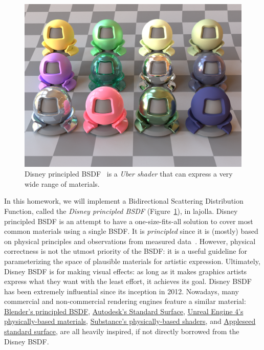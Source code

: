 




\begin{figure}[h]
    \includegraphics[width=\linewidth]{imgs/disney_bsdf.png}
    \caption{Disney principled BSDF~\cite{Burley:2012:PBS,Burley:2015:EDB} is a \emph{Uber shader} that can express a very wide range of materials.}
    \label{fig:gallery}
\end{figure}

In this homework, we will implement a Bidirectional Scattering Distribution Function, called the \emph{Disney principled BSDF} (Figure~\ref{fig:gallery}), in lajolla. Disney principled BSDF is an attempt to have a one-size-fits-all solution to cover most common materials using a single BSDF. It is \emph{principled} since it is (mostly) based on physical principles and observations from measured data~\cite{Matusik:2003:DRM}. However, physical correctness is not the utmost priority of the BSDF: it is a useful guideline for parameterizing the space of plausible materials for artistic expression. Ultimately, Disney BSDF is for making visual effects: as long as it makes graphics artists express what they want with the least effort, it achieves its goal. Disney BSDF has been extremely influential since its inception in 2012. Nowadays, many commercial and non-commercial rendering engines feature a similar material: \href{https://docs.blender.org/manual/en/latest/render/shader_nodes/shader/principled.html}{Blender's principled BSDF}, \href{https://autodesk.github.io/standard-surface/}{Autodesk's Standard Surface}, \href{https://docs.unrealengine.com/4.26/en-US/RenderingAndGraphics/Materials/PhysicallyBased/}{Unreal Engine 4's physically-based materials}, \href{https://substance3d.adobe.com/tutorials/courses/the-pbr-guide-part-1}{Substance's physically-based shaders}, and \href{https://appleseed.readthedocs.io/projects/appleseed-maya/en/master/shaders/material/as_standard_surface.html}{Appleseed standard surface}, are all heavily inspired, if not directly borrowed from the Disney BSDF.

